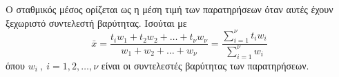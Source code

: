Ο σταθμικός μέσος ορίζεται ως η μέση τιμή των παρατηρήσεων όταν αυτές έχουν ξεχωριστό συντελεστή βαρύτητας. Ισούται με 
\[ \bar{x}=\frac{t_iw_1+t_2w_2+\ldots+t_\nu w_\nu}{w_1+w_2+\ldots+w_\nu}=\frac{\sum\limits_{i=1}^{\nu}{t_iw_i}}{\sum\limits_{i=1}^{\nu}{w_i}} \]
όπου $ w_i\ ,\ i=1,2,\ldots,\nu $ είναι οι συντελεστές βαρύτητας των παρατηρήσεων.
